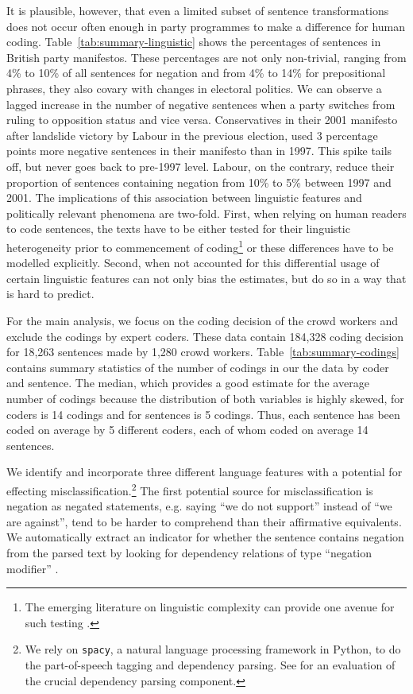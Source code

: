 \documentclass[a4paper, 12pt]{article}
\begin{document}
It is plausible, however, that even a limited subset of sentence transformations does not occur often enough in party programmes to make a difference for human coding. Table~\ref{tab:summary-linguistic} shows the percentages of sentences in British party manifestos. These percentages are not only non-trivial, ranging from 4\% to 10\% of all sentences for negation and from 4\% to 14\% for prepositional phrases, they also covary with changes in electoral politics. We can observe a lagged increase in the number of negative sentences when a party switches from ruling to opposition status and vice versa. Conservatives in their 2001 manifesto after landslide victory by Labour in the previous election, used 3 percentage points more negative sentences in their manifesto than in 1997. This spike tails off, but never goes back to pre-1997 level. Labour, on the contrary, reduce their proportion of sentences containing negation from 10\% to 5\% between 1997 and 2001. The implications of this association between linguistic features and politically relevant phenomena are two-fold. First, when relying on human readers to code sentences, the texts have to be either tested for their linguistic heterogeneity prior to commencement of coding\footnote{The emerging literature on linguistic complexity can provide one avenue for such testing \citep{Spirling2015}.} or these differences have to be modelled explicitly. Second, when not accounted for this differential usage of certain linguistic features can not only bias the estimates, but do so in a way that is hard to predict.

For the main analysis, we focus on the coding decision of the crowd workers and exclude the codings by expert coders. These data contain 184,328 coding decision for 18,263 sentences made by 1,280 crowd workers. Table~\ref{tab:summary-codings} contains summary statistics of the number of codings in our the data by coder and sentence. The median, which provides a good estimate for the average number of codings because the distribution of both variables is highly skewed, for coders is 14 codings and for sentences is 5 codings. Thus, each sentence has been coded on average by 5 different coders, each of whom coded on average 14 sentences.

We identify and incorporate three different language features with a potential for effecting misclassification.\footnote{We rely on \texttt{spacy}, a natural language processing framework in Python, to do the part-of-speech tagging and dependency parsing. See \citet{CTS2015} for an evaluation of the crucial dependency parsing component.} The first potential source for misclassification is negation as negated statements, e.g. saying \enquote{we do not support} instead of \enquote{we are against}, tend to be harder to comprehend than their affirmative equivalents. We automatically extract an indicator for whether the sentence contains negation from the parsed text by looking for dependency relations of type \enquote{negation modifier} \citep[see][33]{CP2012}.
\end{document}
